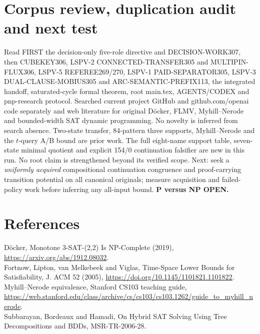 \documentclass[11pt]{article}
\begin{document}
\section{Corpus review, duplication audit and next test}
Read FIRST the decision-only five-role directive and DECISION-WORK307, then CUBEKEY306, LSPV-2 CONNECTED-TRANSFER305 and MULTIPIN-FLUX306, LSPV-5 REFEREE269/270, LSPV-1 PAID-SEPARATOR305, LSPV-3 DUAL-CLAUSE-MOBIUS305 and ARC-SEMANTIC-PREFIX113, the integrated handoff, saturated-cycle formal theorem, root main.tex, AGENTS/CODEX and pnp-research protocol. Searched current project GitHub and github.com/openai code separately and web literature for original D\"ocker, FLMV, Myhill--Nerode and bounded-width SAT dynamic programming. No novelty is inferred from search absence. Two-state transfer, 84-pattern three supports, Myhill--Nerode and the $t$-query A/B bound are prior work. The full eight-name support table, seven-state minimal quotient and explicit 154/0 continuation falsifier are new in this run. No root claim is strengthened beyond its verified scope.
Next: seek a \emph{uniformly acquired} compositional continuation congruence and proof-carrying transition potential on all canonical originals; measure acquisition and failed-policy work before inferring any all-input bound. \textbf{P versus NP OPEN.}
\section*{References}
\noindent [1] D\"ocker, Monotone 3-SAT-(2,2) Is NP-Complete (2019), \url{https://arxiv.org/abs/1912.08032}.\\
[2] Fortnow, Lipton, van Melkebeek and Viglas, Time-Space Lower Bounds for Satisfiability, J. ACM 52 (2005), \url{https://doi.org/10.1145/1101821.1101822}.\\
[3] Myhill--Nerode equivalence, Stanford CS103 teaching guide, \url{https://web.stanford.edu/class/archive/cs/cs103/cs103.1262/guide_to_myhill_nerode}.\\
[4] Subbarayan, Bordeaux and Hamadi, On Hybrid SAT Solving Using Tree Decompositions and BDDs, MSR-TR-2006-28.
\end{document}
